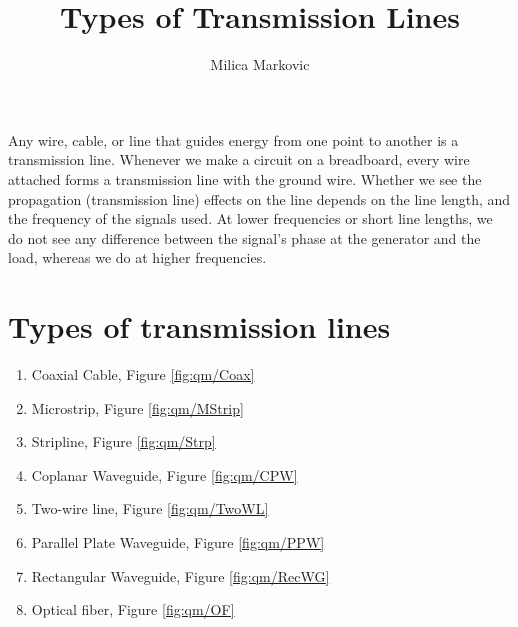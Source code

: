 \documentclass{ximera}
\title{Types of Transmission Lines}
\author{Milica Markovic}
\begin{document}
  
\begin{abstract}  

\end{abstract}  
\maketitle    






Any wire, cable, or line that guides energy from one point to another
is a transmission line. Whenever we make a circuit on a breadboard,
every wire attached forms a transmission line with the ground wire. Whether we see the propagation (transmission line) effects on the
line depends on the line length, and the frequency of the signals used. 
At lower frequencies or short line lengths, we do not
see any difference between the signal's phase at the generator and the load,
whereas we do at higher frequencies.








\section{Types of transmission lines}

\begin{enumerate}
\item Coaxial Cable, Figure \ref{fig:qm/Coax}
\item Microstrip, Figure \ref{fig:qm/MStrip}
\item Stripline, Figure \ref{fig:qm/Strp}
\item Coplanar Waveguide, Figure \ref{fig:qm/CPW}
\item Two-wire line, Figure \ref{fig:qm/TwoWL}
\item Parallel Plate Waveguide, Figure \ref{fig:qm/PPW}
\item Rectangular Waveguide, Figure \ref{fig:qm/RecWG}
\item Optical fiber, Figure \ref{fig:qm/OF}
\end{enumerate}
\end{document}
